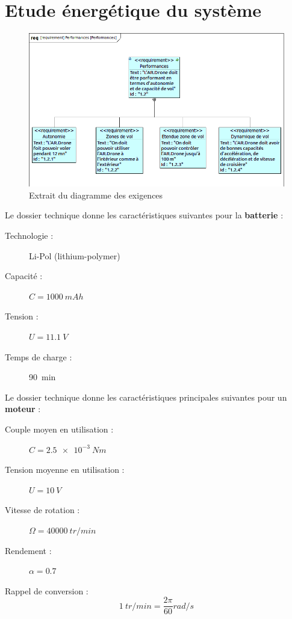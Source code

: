 \documentclass[10pt,fleqn]{article} %
\begin{document}
\section{Etude énergétique du système}

\begin{figure}
    \centering
    \includegraphics[height=0.3\textheight]{images/exigence_drone.png}
    \caption{Extrait du diagramme des exigences}
    \label{fig:exi}
\end{figure}

Le dossier technique donne les caractéristiques suivantes pour la \textbf{batterie} :
\begin{description}
 \item[Technologie :] Li-Pol (lithium-polymer)
\item[Capacité :] $ C = \SI{1000}{mAh} $
\item[Tension :] $U=\SI{11.1}{V}$
\item[Temps de charge :] \SI{90}{min}
\end{description}

Le dossier technique donne les caractéristiques principales suivantes pour un \textbf{moteur} : 
\begin{description}
    \item[Couple moyen en utilisation : ] $C = \SI{2.5e-3}{Nm}$
    \item[Tension moyenne en utilisation : ] $U = \SI{10}{V}$
    \item[Vitesse de rotation : ] $\Omega = \SI{40000}{tr/min}$
    \item[Rendement : ] $\alpha = 0.7$
\end{description}

Rappel de conversion : $$\SI{1}{tr/min} = \frac{2\pi}{60}\si{rad/s}$$
\end{document}
